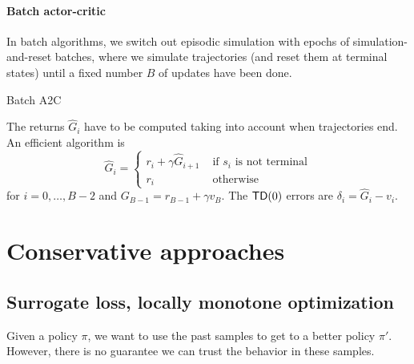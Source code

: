 \documentclass[../course-notes.tex]{subfiles}
\begin{document}
\paragraph{Batch actor-critic} In batch algorithms, we switch out episodic simulation with epochs of simulation-and-reset batches, where we simulate trajectories (and reset them at terminal states) until a fixed number $B$ of updates have been done.

\begin{algorithm}[H]
\caption{Batch A2C}\label{algo:BatchA2C}
\end{algorithm}

The returns $\widehat{G}_i$ have to be computed taking into account when trajectories end.
An efficient algorithm is
\[
	\widehat{G}_i =
	\begin{cases}
	r_i + \gamma \widehat{G}_{i+1}& \text{ if } s_i \text{ is not terminal} \\
	r_i & \text{ otherwise}
	\end{cases}
\]
for $i=0,\ldots,B-2$ and $G_{B-1} = r_{B-1} + \gamma v_B$. The $\mathsf{TD}(0)$ errors are $\delta_i = \widehat{G}_i - v_i$.


\section{Conservative approaches}

\subsection{Surrogate loss, locally monotone optimization}

Given a policy $\pi$, we want to use the past samples to get to a better policy $\pi'$. However, there is no guarantee we can trust the behavior in these samples.
\end{document}
